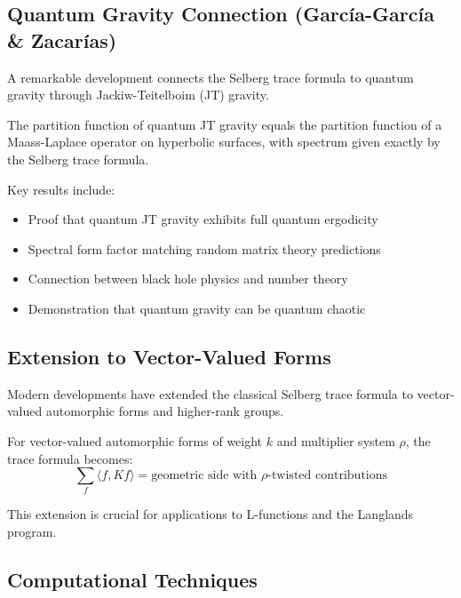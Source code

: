 \subsection{Quantum Gravity Connection (García-García \& Zacarías)}

A remarkable development connects the Selberg trace formula to quantum gravity through Jackiw-Teitelboim (JT) gravity.

\begin{theorem}
\label{thm:jt_selberg}
The partition function of quantum JT gravity equals the partition function of a Maass-Laplace operator on hyperbolic surfaces, with spectrum given exactly by the Selberg trace formula.
\end{theorem}

Key results include:
\begin{itemize}
\item Proof that quantum JT gravity exhibits full quantum ergodicity
\item Spectral form factor matching random matrix theory predictions
\item Connection between black hole physics and number theory
\item Demonstration that quantum gravity can be quantum chaotic
\end{itemize}

\subsection{Extension to Vector-Valued Forms}

Modern developments have extended the classical Selberg trace formula to vector-valued automorphic forms and higher-rank groups.

\begin{definition}
\label{def:vector_valued_trace}
For vector-valued automorphic forms of weight $k$ and multiplier system $\rho$, the trace formula becomes:
$$\sum_{f} \langle f, Kf \rangle = \text{geometric side with } \rho\text{-twisted contributions}$$
\end{definition}

This extension is crucial for applications to L-functions and the Langlands program.

\subsection{Computational Techniques}

